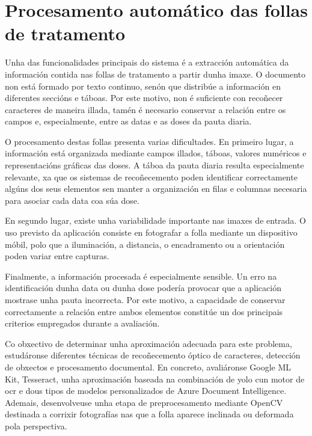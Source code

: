 \chapter{Procesamento automático das follas de tratamento}
\label{chap:procesamento-follas}

Unha das funcionalidades principais do sistema é a extracción automática da información contida nas follas de tratamento a partir dunha imaxe. O documento non está formado por texto continuo, senón que distribúe a información en diferentes seccións e táboas. Por este motivo, non é suficiente con recoñecer caracteres de maneira illada, tamén é necesario conservar a relación entre os campos e, especialmente, entre as datas e as doses da pauta diaria.

O procesamento destas follas presenta varias dificultades. En primeiro lugar, a información está organizada mediante campos illados, táboas, valores numéricos e representacións gráficas das doses. A táboa da pauta diaria resulta especialmente relevante, xa que os sistemas de recoñecemento poden identificar correctamente algúns dos seus elementos sen manter a organización en filas e columnas necesaria para asociar cada data coa súa dose.

En segundo lugar, existe unha variabilidade importante nas imaxes de entrada. O uso previsto da aplicación consiste en fotografar a folla mediante un dispositivo móbil, polo que a iluminación, a distancia, o encadramento ou a orientación poden variar entre capturas.

Finalmente, a información procesada é especialmente sensible. Un erro na identificación dunha data ou dunha dose podería provocar que a aplicación mostrase unha pauta incorrecta. Por este motivo, a capacidade de conservar correctamente a relación entre ambos elementos constitúe un dos principais criterios empregados durante a avaliación.

Co obxectivo de determinar unha aproximación adecuada para este problema, estudáronse diferentes técnicas de recoñecemento óptico de caracteres, detección de obxectos e procesamento documental. En concreto, avaliáronse Google ML Kit, Tesseract, unha aproximación baseada na combinación de \gls{yolo} cun motor de \gls{ocr} e dous tipos de modelos personalizados de Azure Document Intelligence. Ademais, desenvolveuse unha etapa de preprocesamento mediante OpenCV destinada a corrixir fotografías nas que a folla aparece inclinada ou deformada pola perspectiva.



